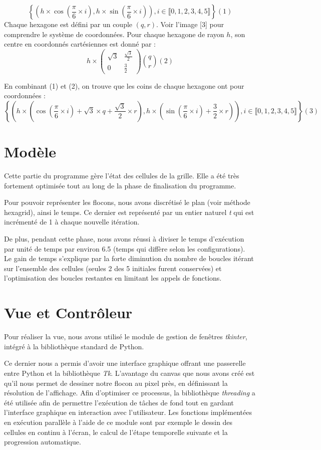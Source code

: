 \documentclass[a4paper,12pt,twoside]{report}
\begin{document}
$$\left \{ \left(h\times\cos\left(\frac{\pi}{6}\times i\right),h\times\sin\left(\frac{\pi}{6}\times i\right)\right), i \in \llbracket 0,1,2,3,4,5 \rrbracket \right \} (1)$$
\medbreak
Chaque hexagone est défini par un couple $\left (q,r \right)$. Voir l’image [3] pour comprendre le système de coordonnées.
Pour chaque hexagone de rayon $h$, son centre en coordonnés cartésiennes est donné par :
$$h\times\begin{pmatrix}
\sqrt{3} & \frac{\sqrt{3}}{2}\\
0 & \frac{3}{2}
\end{pmatrix}\binom{q}{r}(2)$$

En combinant (1) et (2), on trouve que les coins de chaque hexagone ont pour coordonnées :
$$\left \{ \left(h\times\left(\cos\left(\frac{\pi}{6}\times i\right) + \sqrt{3}\times q + \frac{\sqrt{3}}{2}\times r\right),h\times\left(\sin\left(\frac{\pi}{6}\times i\right) + \frac{3}{2}\times r\right)\right), i \in \llbracket 0,1,2,3,4,5 \rrbracket \right \} (3)$$



\section{Modèle}Cette partie du programme gère l'état des cellules de la grille. Elle a été très fortement optimisée tout au long de la phase de finalisation du programme.

Pour pouvoir représenter les flocons, nous avons discrétisé le plan (voir méthode hexagrid), ainsi le temps. Ce dernier est représenté par un entier naturel \emph{t} qui est incrémenté de 1 à chaque nouvelle itération. 

De plus, pendant cette phase, nous avons réussi à diviser le temps d'exécution par unité de temps par environ 6.5 (temps qui diffère selon les configurations).\\Le gain de temps s'explique par la forte diminution du nombre de boucles itérant sur l'ensemble des cellules (seules 2 des 5 initiales furent conservées) et l'optimisation des boucles restantes en limitant les appels de fonctions.

\section{Vue et Contrôleur}Pour réaliser la vue, nous avons utilisé le module de gestion de fenêtres \emph{tkinter},  intégré à la bibliothèque standard de Python.

Ce dernier nous a permis d’avoir une interface graphique offrant une passerelle entre Python et la bibliothèque \emph{Tk}. L’avantage du canvas que nous avons créé est qu’il nous permet de dessiner notre flocon au pixel près, en définissant la résolution de l’affichage.
\medbreak
Afin d'optimiser ce processus, la bibliothèque \emph{threading} a été utilisée afin de permettre l'exécution de tâches de fond tout en gardant l'interface graphique en interaction avec l'utilisateur. Les fonctions implémentées en exécution parallèle à l'aide de ce module sont par exemple le dessin des cellules en continu à l'écran, le calcul de l'étape temporelle suivante et la progression automatique.
\end{document}
